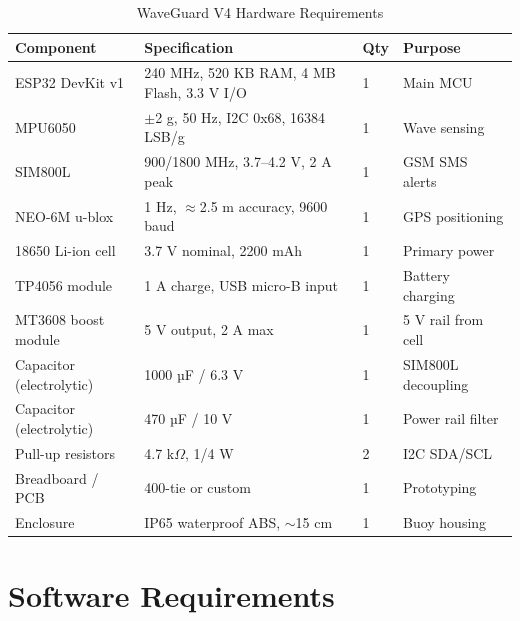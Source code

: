 \begin{table}[H]
\centering
\caption{WaveGuard V4 Hardware Requirements}
\label{tab:hw_req}
\begin{tabularx}{\textwidth}{l X l l}
\toprule
\textbf{Component}   & \textbf{Specification}             & \textbf{Qty} & \textbf{Purpose} \\
\midrule
ESP32 DevKit v1      & 240 MHz, 520 KB RAM, 4 MB Flash, 3.3 V I/O & 1 & Main MCU \\
MPU6050              & $\pm$2 g, 50 Hz, I2C 0x68, 16384 LSB/g & 1 & Wave sensing \\
SIM800L              & 900/1800 MHz, 3.7–4.2 V, 2 A peak   & 1 & GSM SMS alerts \\
NEO-6M u-blox        & 1 Hz, $\approx$2.5 m accuracy, 9600 baud & 1 & GPS positioning \\
18650 Li-ion cell    & 3.7 V nominal, 2200 mAh              & 1 & Primary power \\
TP4056 module        & 1 A charge, USB micro-B input        & 1 & Battery charging \\
MT3608 boost module  & 5 V output, 2 A max                  & 1 & 5 V rail from cell \\
Capacitor (electrolytic) & 1000 µF / 6.3 V                  & 1 & SIM800L decoupling \\
Capacitor (electrolytic) & 470 µF / 10 V                    & 1 & Power rail filter \\
Pull-up resistors    & 4.7 k$\Omega$, 1/4 W                & 2 & I2C SDA/SCL \\
Breadboard / PCB     & 400-tie or custom                    & 1 & Prototyping \\
Enclosure            & IP65 waterproof ABS, $\sim$15 cm     & 1 & Buoy housing \\
\bottomrule
\end{tabularx}
\end{table}

\section{Software Requirements}

